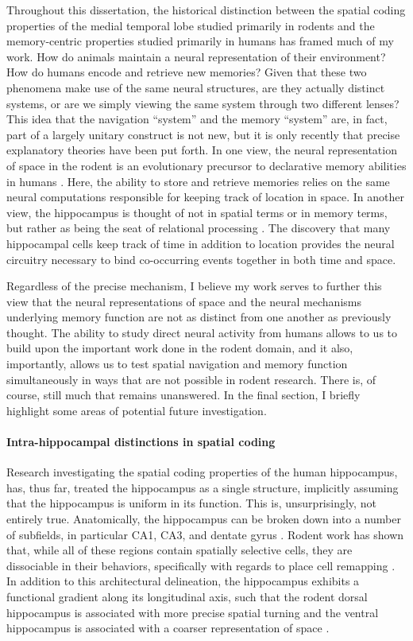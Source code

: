 Throughout this dissertation, the historical distinction between the spatial coding properties of the medial temporal lobe studied primarily in rodents and the memory-centric properties studied primarily in humans has framed much of my work. How do animals maintain a neural representation of their environment? How do humans encode and retrieve new memories? Given that these two phenomena make use of the same neural structures, are they actually distinct systems, or are we simply viewing the same system through two different lenses? This idea that the navigation ``system'' and the memory ``system'' are, in fact, part of a largely unitary construct is not new, but it is only recently that precise explanatory theories have been put forth. In one view, the neural representation of space in the rodent is an evolutionary precursor to declarative memory abilities in humans \citep{BuzsMose13}. Here, the ability to store and retrieve memories relies on the same neural computations responsible for keeping track of location in space. In another view, the hippocampus is thought of not in spatial terms or in memory terms, but rather as being the seat of relational processing \citep{CoheEich93,Eich14}. The discovery that many hippocampal cells keep track of time in addition to location \citep{MacDEtal11,PastEtal08} provides the neural circuitry necessary to bind co-occurring events together in both time and space.

Regardless of the precise mechanism, I believe my work serves to further this view that the neural representations of space and the neural mechanisms underlying memory function are not as distinct from one another as previously thought. The ability to study direct neural activity from humans allows to us to build upon the important work done in the rodent domain, and it also, importantly, allows us to test spatial navigation and memory function simultaneously in ways that are not possible in rodent research. There is, of course, still much that remains unanswered. In the final section, I briefly highlight some areas of potential future investigation.

\paragraph{Intra-hippocampal distinctions in spatial coding}
Research investigating the spatial coding properties of the human hippocampus, has, thus far, treated the hippocampus as a single structure, implicitly assuming that the hippocampus is uniform in its function. This is, unsurprisingly, not entirely true. Anatomically, the hippocampus can be broken down into a number of subfields, in particular CA1, CA3, and dentate gyrus \citep{AndeEtal06}. Rodent work has shown that, while all of these regions contain spatially selective cells, they are dissociable in their behaviors, specifically with regards to place cell remapping \citep{LeutEtal04,LeutEtal05a,LeutEtal07}. In addition to this architectural delineation, the hippocampus exhibits a functional gradient along its longitudinal axis, such that the rodent dorsal hippocampus is associated with more precise spatial turning and the ventral hippocampus is associated with a coarser representation of space \citep{KjelEtal08,StraEtal14}.

